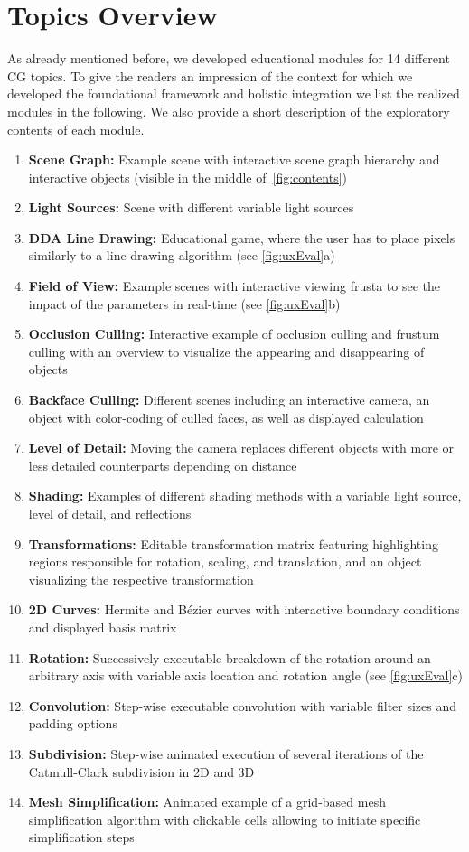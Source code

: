 \section{Topics Overview\label{sec:topics}}
As already mentioned before, we developed educational modules for 14 different CG topics. To give the readers an impression of the context for which we developed the foundational framework and holistic integration we list the realized modules in the following. We also provide a short description of the exploratory contents of each module.
\begin{enumerate}
	\item \textbf{Scene Graph:} Example scene with interactive scene graph hierarchy and interactive objects (visible in the middle of~\autoref{fig:contents})
	\item \textbf{Light Sources:} Scene with different variable light sources
	\item \textbf{DDA Line Drawing:} Educational game, where the user has to place pixels similarly to a line drawing algorithm (see \autoref{fig:uxEval}a)
	\item \textbf{Field of View:} Example scenes with interactive viewing frusta to see the impact of the parameters in real-time (see \autoref{fig:uxEval}b)
	\item \textbf{Occlusion Culling:} Interactive example of occlusion culling and frustum culling with an overview to visualize the appearing and disappearing of objects
	\item \textbf{Backface Culling:} Different scenes including an interactive camera, an object with color-coding of culled faces, as well as displayed calculation
	\item \textbf{Level of Detail:} Moving the camera replaces different objects with more or less detailed counterparts depending on distance
	\item \textbf{Shading:} Examples of different shading methods with a variable light source, level of detail, and reflections
	\item \textbf{Transformations:} Editable transformation matrix featuring highlighting regions responsible for  rotation, scaling, and translation, and an object visualizing the respective transformation
	\item \textbf{2D Curves:} Hermite and B{\'e}zier curves with interactive boundary conditions and displayed basis matrix
	\item \textbf{Rotation:} Successively executable breakdown of the rotation around an arbitrary axis with variable axis location and rotation angle (see \autoref{fig:uxEval}c)
	\item \textbf{Convolution:} Step-wise executable convolution with variable filter sizes and padding options
	\item \textbf{Subdivision:} Step-wise animated execution of several iterations of the Catmull-Clark subdivision in 2D and 3D
	\item \textbf{Mesh Simplification:} Animated example of a grid-based mesh simplification algorithm with clickable cells allowing to initiate specific simplification steps
\end{enumerate}
